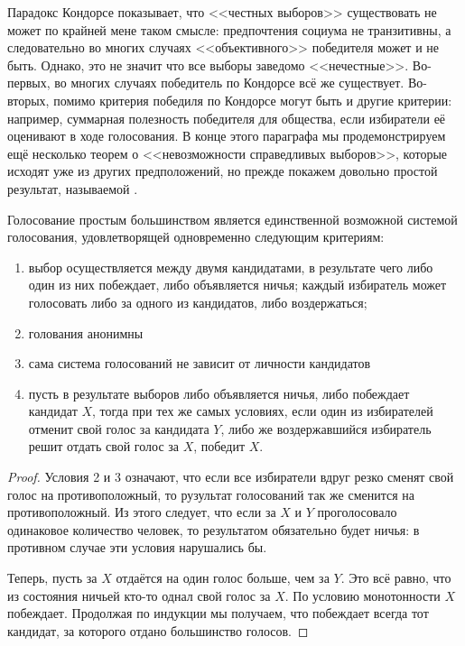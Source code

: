 Парадокс Кондорсе показывает, что <<честных выборов>> существовать не может по крайней мене таком смысле: предпочтения социума не транзитивны, а следовательно во многих случаях <<объективного>> победителя может и не быть. Однако, это не значит что все выборы заведомо <<нечестные>>. Во-первых, во многих случаях победитель по Кондорсе всё же существует. Во-вторых, помимо критерия победиля по Кондорсе могут быть и другие критерии: например, суммарная полезность победителя для общества, если избиратели её оценивают в ходе голосования. В конце этого параграфа мы продемонстрируем ещё несколько теорем о <<невозможности справедливых выборов>>, которые исходят уже из других предположений, но прежде покажем довольно простой результат, называемой .

\begin{thm}
Голосование простым большинством является единственной возможной системой голосования, удовлетворящей одновременно следующим критериям:
\begin{enumerate}
\item выбор осуществляется между двумя кандидатами, в результате чего либо один из них побеждает, либо объявляется ничья; каждый избиратель может голосовать либо за одного из кандидатов, либо воздержаться;
\item голования анонимны
\item сама система голосований не зависит от личности кандидатов
\item пусть в результате выборов либо объявляется ничья, либо побеждает кандидат $X$, тогда при тех же самых условиях, если один из избирателей отменит свой голос за кандидата $Y$, либо же воздержавшийся избиратель решит отдать свой голос за $X$, победит $X$.
\end{enumerate}
\end{thm}
\begin{proof}
Условия 2 и 3 означают, что если все избиратели вдруг резко сменят свой голос на противоположный, то рузультат голосований так же сменится на противоположный. Из этого следует, что если за $X$ и $Y$ проголосовало одинаковое количество человек, то результатом обязательно будет ничья: в противном случае эти условия нарушались бы.

Теперь, пусть за $X$ отдаётся на один голос больше, чем за $Y$. Это всё равно, что из состояния ничьей кто-то однал свой голос за $X$. По условию монотонности $X$ побеждает. Продолжая по индукции мы получаем, что побеждает всегда тот кандидат, за которого отдано большинство голосов.
\end{proof}

